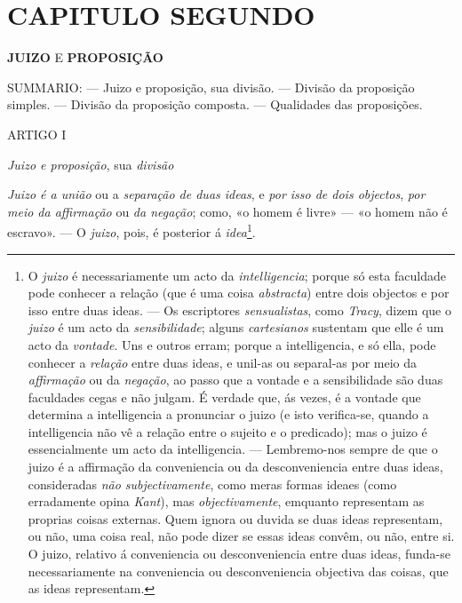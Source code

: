 
\chapter*{CAPITULO SEGUNDO}

 \textbf{JUIZO} E \textbf{PROPOSIÇÃO}

\textsc{SUMMARIO}: --- Juizo e proposição, sua divisão. --- Divisão da proposição simples. --- Divisão da proposição composta. --- Qualidades das proposições.

ARTIGO I

\emph{Juizo e proposição}, sua \emph{divisão}


\emph{Juizo é a união} ou a \emph{separação de duas ideas}, e \emph{por isso de dois objectos}, \emph{por meio da affirmação} ou \emph{da negação}; como, «o homem é livre» --- «o homem não é escravo». --- O \emph{juizo}, pois, é posterior á \emph{idea}\footnote{O \emph{juizo} é necessariamente um acto da \emph{intelligencia}; porque só esta faculdade pode conhecer a relação (que é uma coisa \emph{abstracta}) entre dois objectos e por isso entre duas ideas. --- Os escriptores \emph{sensualistas}, como \emph{Tracy}, dizem que o \emph{juizo} é um acto da \emph{sensibilidade}; alguns \emph{cartesianos} sustentam que elle é um acto da \emph{vontade}. Uns e outros erram; porque a intelligencia, e só ella, pode conhecer a \emph{relação} entre duas ideas, e unil-as ou separal-as por meio da \emph{affirmação} ou da \emph{negação}, ao passo que a vontade e a sensibilidade são duas faculdades cegas e não julgam. É verdade que, ás vezes, é a vontade que determina a intelligencia a pronunciar o juizo (e isto verifica-se, quando a intelligencia não vê a relação entre o sujeito e o predicado); mas o juizo é essencialmente um acto da intelligencia. --- Lembremo-nos sempre de que o juizo é a affirmação da conveniencia ou da desconveniencia entre duas ideas, consideradas \emph{não subjectivamente}, como meras formas ideaes (como erradamente opina \emph{Kant}), mas \emph{objectivamente}, emquanto representam as proprias coisas externas. Quem ignora ou duvida se duas ideas representam, ou não, uma coisa real, não pode dizer se essas ideas convêm, ou não, entre si. O juizo, relativo á conveniencia ou desconveniencia entre duas ideas, funda-se necessariamente na conveniencia ou desconveniencia objectiva das coisas, que as ideas representam.}.

